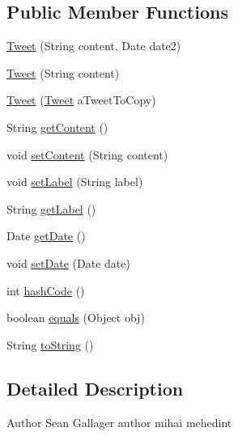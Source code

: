 \subsection*{Public Member Functions}
\begin{DoxyCompactItemize}
\item 
\mbox{\hyperlink{classbridges_1_1data__src__dependent_1_1_tweet_a615278c2672b2cb310d3c645566ad5cd}{Tweet}} (String content, Date date2)
\item 
\mbox{\hyperlink{classbridges_1_1data__src__dependent_1_1_tweet_a611e969f630c86098b204cfb4655f79b}{Tweet}} (String content)
\item 
\mbox{\hyperlink{classbridges_1_1data__src__dependent_1_1_tweet_a0b0ee5fa9a6221da95020bd5f78667d9}{Tweet}} (\mbox{\hyperlink{classbridges_1_1data__src__dependent_1_1_tweet}{Tweet}} a\+Tweet\+To\+Copy)
\item 
String \mbox{\hyperlink{classbridges_1_1data__src__dependent_1_1_tweet_a9b48f1ffc14fea21eb8a3e742601974a}{get\+Content}} ()
\item 
void \mbox{\hyperlink{classbridges_1_1data__src__dependent_1_1_tweet_a80ac618b5817392ce356657b2bf4145a}{set\+Content}} (String content)
\item 
void \mbox{\hyperlink{classbridges_1_1data__src__dependent_1_1_tweet_aa193633f4f61cc957f05a1c551f18822}{set\+Label}} (String label)
\item 
String \mbox{\hyperlink{classbridges_1_1data__src__dependent_1_1_tweet_a4b31431e42327efa953adde4c15cf168}{get\+Label}} ()
\item 
Date \mbox{\hyperlink{classbridges_1_1data__src__dependent_1_1_tweet_a801b0b5ea0127746c9c8ec0fc5e35ac2}{get\+Date}} ()
\item 
void \mbox{\hyperlink{classbridges_1_1data__src__dependent_1_1_tweet_a1a57c028bb87ad4e94af496a7260ffe9}{set\+Date}} (Date date)
\item 
int \mbox{\hyperlink{classbridges_1_1data__src__dependent_1_1_tweet_adf7dadcda59b68bb00b42480e4ad9956}{hash\+Code}} ()
\item 
boolean \mbox{\hyperlink{classbridges_1_1data__src__dependent_1_1_tweet_ae5edb76b9dd0f76b56eb40aa7c8cc077}{equals}} (Object obj)
\item 
String \mbox{\hyperlink{classbridges_1_1data__src__dependent_1_1_tweet_adfba67504a7463a7f16aff46d2bb893f}{to\+String}} ()
\end{DoxyCompactItemize}


\subsection{Detailed Description}
\begin{DoxyAuthor}{Author}
Sean Gallager  author mihai mehedint 
\end{DoxyAuthor}


